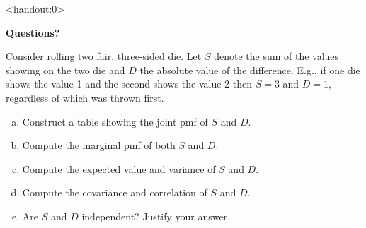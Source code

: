 \begin{frame}<handout:0>
  \begin{center}
    \Huge{\textbf{Questions?}}
  \end{center}
\end{frame}

\begin{frame}

\begin{block}{\exercise}
Consider rolling two fair, three-sided die. Let $S$ denote the sum of the values showing on the two die and $D$ the absolute value of the difference. E.g., if one die shows the value 1 and the second shows the value 2 then $S=3$ and $D=1$, regardless of which was thrown first.

\begin{enumerate}[a)]
\item Construct a table showing the joint pmf of $S$ and $D$. 
\item Compute the marginal pmf of both $S$ and $D$. 
\item Compute the expected value and variance of $S$ and $D$.
\item Compute the covariance and correlation of $S$ and $D$. 
\item Are $S$ and $D$ independent? Justify your answer.
\end{enumerate}

\end{block}
\end{frame}

